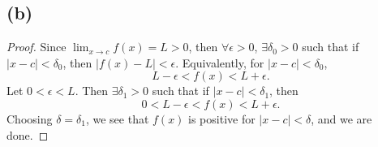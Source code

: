 \documentclass{article}
\begin{document}
\subsection*{(b)}
\begin{proof}
	Since $\lim_{x \to c} f(x) = L > 0$, then $\forall \epsilon > 0$, $\exists \delta_0 > 0$ such that if $|x-c| < \delta_0$, then $|f(x) - L| < \epsilon$. Equivalently, for $|x-c| < \delta_0$,
	\begin{equation}
		L -\epsilon < f(x) < L + \epsilon.
	\end{equation}
	Let $0 < \epsilon < L$. Then $\exists \delta_1 > 0$ such that if $|x - c| < \delta_1$, then
	\begin{equation}
		0 < L - \epsilon < f(x) < L + \epsilon.
	\end{equation}
	Choosing $\delta = \delta_1$, we see that $f(x)$ is positive for $|x - c| < \delta$, and we are done.
\end{proof}
\end{document}
